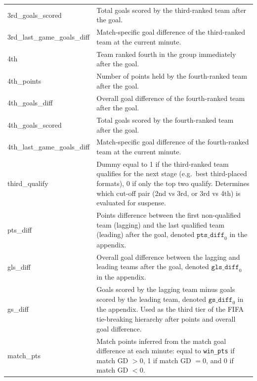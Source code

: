\documentclass[11pt,a4paper]{article}
\begin{document}
\begin{longtable}{p{4.5cm} p{10.5cm}}
3rd\_goals\_scored &
Total goals scored by the third-ranked team after the goal. \\

3rd\_last\_game\_goals\_diff &
Match-specific goal difference of the third-ranked team at the current minute. \\

4th &
Team ranked fourth in the group immediately after the goal. \\

4th\_points &
Number of points held by the fourth-ranked team after the goal. \\

4th\_goals\_diff &
Overall goal difference of the fourth-ranked team after the goal. \\

4th\_goals\_scored &
Total goals scored by the fourth-ranked team after the goal. \\

4th\_last\_game\_goals\_diff &
Match-specific goal difference of the fourth-ranked team at the current minute. \\

third\_qualify &
Dummy equal to 1 if the third-ranked team qualifies for the next stage (e.g.\ best third-placed formats), 0 if only the top two qualify. Determines which cut-off pair (2nd vs 3rd, or 3rd vs 4th) is evaluated for suspense. \\

pts\_diff &
Points difference between the first non-qualified team (lagging) and the last qualified team (leading) after the goal, denoted $\texttt{pts\_diff}_0$ in the appendix. \\

gls\_diff &
Overall goal difference between the lagging and leading teams after the goal, denoted $\texttt{gls\_diff}_0$ in the appendix. \\

gs\_diff &
Goals scored by the lagging team minus goals scored by the leading team, denoted $\texttt{gs\_diff}_0$ in the appendix. Used as the third tier of the FIFA tie-breaking hierarchy after points and overall goal difference. \\

match\_pts &
Match points inferred from the match goal difference at each minute: equal to \texttt{win\_pts} if match GD $> 0$, 1 if match GD $= 0$, and 0 if match GD $< 0$. \\


\end{longtable}
\end{document}
